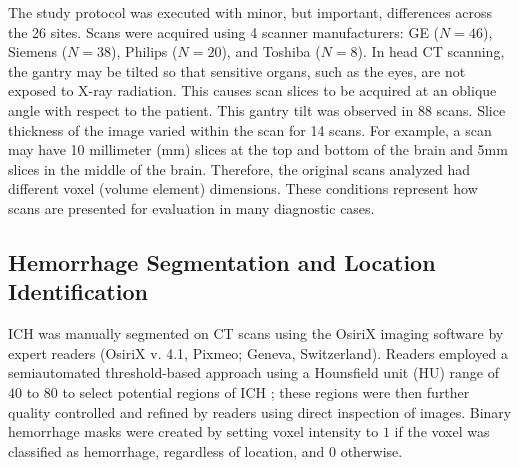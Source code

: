 \documentclass{elsarticle_nonatbib}\usepackage[]{graphicx}\usepackage[]{color}
\begin{document}
The study protocol was executed with minor, but important, differences across the 26 sites.  Scans were acquired using 4 scanner manufacturers: GE ($N=46$),  Siemens ($N=38$),  Philips ($N=20$),  and Toshiba ($N=8$).   In head CT scanning, the gantry may be tilted so that sensitive organs, such as the eyes, are not exposed to X-ray radiation.  This causes scan slices to be acquired at an oblique angle with respect to the patient.  This gantry tilt was observed in 88 scans.
Slice thickness of the image varied within the scan for 14 scans.
For example, a scan may have 10 millimeter (mm) slices at the top and bottom of the brain and 5mm slices in the middle of the brain.  Therefore, the original scans analyzed had different voxel (volume element) dimensions.  These conditions represent how scans are presented for evaluation in many diagnostic cases.



\subsection{Hemorrhage Segmentation and Location Identification}
ICH was manually segmented on CT scans using the OsiriX imaging software by expert readers (OsiriX v. 4.1, Pixmeo; Geneva, Switzerland).  Readers employed a semiautomated threshold-based approach using a Hounsfield unit (HU) range of $40$ to $80$ to select potential regions of ICH \citep{bergstrom_variation_1977, smith_imaging_2006}; these regions were then further quality controlled and refined by readers using direct inspection of images.  Binary hemorrhage masks were created by setting voxel intensity to $1$ if the voxel was classified as hemorrhage, regardless of location, and $0$ otherwise.  
\end{document}
